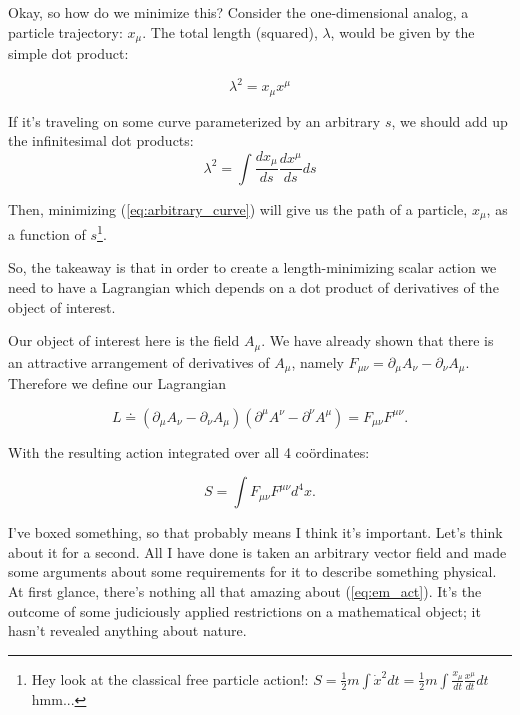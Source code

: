 \documentclass[11pt]{article}
\begin{document}
Okay, so how do we minimize this?  Consider the one-dimensional analog, a particle trajectory:  $x_\mu$.  The total length (squared), $\lambda$, would be given by the simple dot product:

\begin{equation}
\lambda^2 = x_\mu x^\mu
\end{equation}

If it's traveling on some curve parameterized by an arbitrary $s$, we should add up the infinitesimal dot products:
\begin{equation}\label{eq:arbitrary_curve}
\lambda^2 = \int \frac{d x_\mu}{d s}\frac{d x^\mu}{ds} ds
\end{equation}

Then, minimizing (\ref{eq:arbitrary_curve}) will give us the path of a particle, $x_\mu$, as a function of $s$\footnote{Hey look at the classical free particle action!: $S =  \frac{1}{2}m \int\dot{x}^2dt = \frac{1}{2}m\int\frac{x_\mu}{dt}\frac{x^\mu}{dt}dt$ hmm...}.


So, the takeaway is that in order to create a length-minimizing scalar action we need to have a Lagrangian which depends on a dot product of derivatives of the object of interest.

Our object of interest here is the field $A_\mu$.  We have already shown that there is an attractive arrangement of derivatives of $A_\mu$, namely $F_{\mu\nu} = \partial_\mu A_\nu - \partial_\nu A_\mu$.  Therefore we define our Lagrangian

\begin{equation}\label{eq:em_lagr}
L \doteq (\partial_\mu A_\nu - \partial_\nu A_\mu)(\partial^\mu A^\nu - \partial^\nu A^\mu) = F_{\mu\nu}F^{\mu\nu}.
\end{equation}

With the resulting action integrated over all 4 co\"{o}rdinates:

\begin{equation}\label{eq:em_act}
\boxed{S = \int F_{\mu\nu}F^{\mu\nu} d^4x.}
\end{equation}

I've boxed something, so that probably means I think it's important.  Let's think about it for a second.  All I have done is taken an arbitrary vector field and made some arguments about some requirements for it to describe something physical.  At first glance, there's nothing all that amazing about (\ref{eq:em_act}).  It's the outcome of some judiciously applied restrictions on a mathematical object; it hasn't revealed anything about nature.
 
\end{document}
